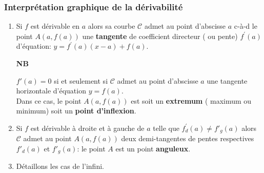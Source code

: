 \subsubsection*{Interprétation graphique de la dérivabilité}
\begin{enumerate}
\item Si $ f $ est dérivable en $ a $ alors sa courbe $ \mathcal{C} $ admet au point d'abscisse  $ a $  c-à-d le point $A(a,f(a))$ une \textbf{ tangente} de coefficient directeur ( ou pente) $  f^{'}(a)$ d'équation:  
$ y=f^{'}(a)(x-a)+ f(a) $.


\textbf{NB}

 $  f'(a)=0$  si et seulement si $ \mathcal{C} $ admet au point d'abscisse  $ a $ une tangente horizontale d'équation $ y=f(a). $ \\ Dans ce cas, le point $A(a,f(a))$  est  soit un \textbf{extremum} ( maximum ou minimum) soit un \textbf{point d'inflexion}.

 \item Si $ f $ est dérivable  à droite et à gauche  de $ a $ telle que $ f^{'}_{d}(a)\neq f'_{g}(a) $ alors $ \mathcal{C} $ admet au  point $A(a,f(a))$ deux demi-tangentes de pentes respectives  $ f'_{d}(a)$ et $ f'_{g}(a) $: le point $A$ est un point \textbf{anguleux}.
 \item Détaillons les cas de l'infini.


\end{enumerate}
